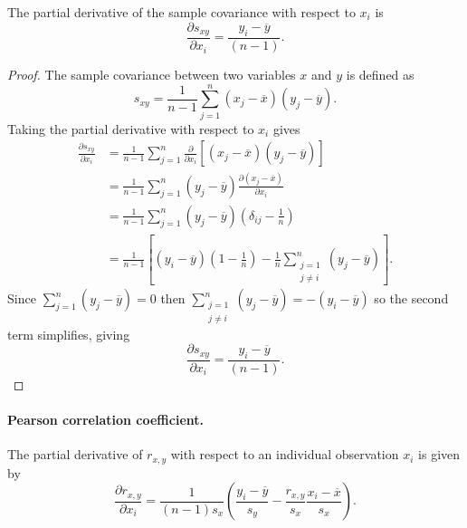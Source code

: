 The partial derivative of the sample covariance with respect to \(x_i\) is
\begin{equation}
    \frac{\partial s_{xy}}{\partial x_i} = \frac{y_i - \overline{y}}{(n-1)}.
    \label{eq:sample_covariance_derivative}
\end{equation}
\begin{proof}
    The sample covariance between two variables \(x\) and \(y\) is defined as
    \[
        s_{xy} = \frac{1}{n-1} \sum_{j=1}^{n} (x_j - \overline{x})(y_j - \overline{y}).
    \]
    Taking the partial derivative with respect to \(x_i\) gives
    \begin{align*}
        \frac{\partial s_{xy}}{\partial x_i}
         & = \frac{1}{n-1} \sum_{j=1}^{n}
        \frac{\partial}{\partial x_i} \left[ (x_j - \overline{x})(y_j - \overline{y}) \right] \\
         & = \frac{1}{n-1} \sum_{j=1}^{n}
        (y_j - \overline{y}) \frac{\partial (x_j - \overline{x})}{\partial x_i}               \\
         & = \frac{1}{n-1} \sum_{j=1}^{n}
        (y_j - \overline{y}) \left( \delta_{ij} - \frac{1}{n} \right)                         \\
         & = \frac{1}{n-1} \left[ (y_i - \overline{y})\!\left( 1 - \frac{1}{n} \right)
        - \frac{1}{n} \sum_{\substack{j=1                                                     \\ j \ne i}}^{n} (y_j - \overline{y}) \right].
    \end{align*}
    Since \(\sum_{j=1}^{n} (y_j - \overline{y}) = 0\) then \(\sum_{\substack{j=1 \\ j \ne i}}^{n} (y_j - \overline{y}) = - (y_i - \overline{y})\) so the second term simplifies, giving
    \[
        \frac{\partial s_{xy}}{\partial x_i}
        = \frac{y_i - \overline{y}}{(n-1)}.
    \]
\end{proof}

\paragraph{Pearson correlation coefficient.}

The partial derivative of \(r_{x,y}\) with respect to an individual observation
\(x_i\) is given by
\begin{equation}
    \frac{\partial r_{x,y}}{\partial x_i} = \frac{1}{(n-1)s_x } \left( \frac{y_i - \overline{y}}{s_y} - \frac{r_{x,y}}{s_x} \frac{x_i - \overline{x}}{s_x} \right).
    \label{eq:pearson_derivative}
\end{equation}

